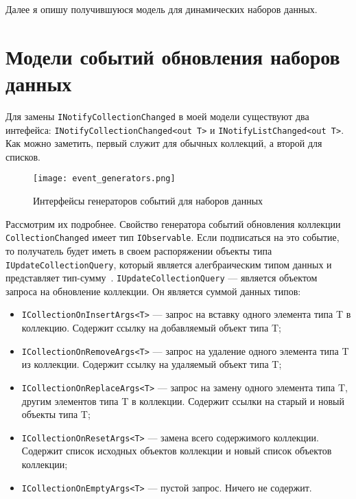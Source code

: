 Далее я опишу получившуюся модель для динамических наборов данных.

\section{Модели событий обновления наборов данных}
\label{sub:research:event_model}

Для замены \lstinline[style=csharpinlinestyle]!INotifyCollectionChanged! в моей модели существуют два интефейса:
\lstinline[style=csharpinlinestyle]!INotifyCollectionChanged<out T>! и \lstinline[style=csharpinlinestyle]!INotifyListChanged<out T>!.
Как можно заметить, первый служит для обычных коллекций, а второй для списков.

\begin{figure}[ht]
\centering
  \texttt{[image: event\_generators.png]}
  \caption{ Интерфейсы генераторов событий для наборов данных }
  \label{fig:event_generators}
\end{figure}

Рассмотрим их подробнее. Свойство генератора событий обновления коллекции \lstinline[style=csharpinlinestyle]!CollectionChanged! имеет тип \lstinline[style=csharpinlinestyle]!IObservable!.
Если подписаться на это событие, то получатель будет иметь в своем распоряжении объекты типа \lstinline[style=csharpinlinestyle]!IUpdateCollectionQuery!,
который является алегбраическим типом данных и представляет тип-сумму~\cite{algebraic_data_type}.
\lstinline[style=csharpinlinestyle]!IUpdateCollectionQuery! --- является объектом запроса на обновление коллекции.
Он является суммой данных типов:

\begin{itemize}
  \item \lstinline[style=csharpinlinestyle]!ICollectionOnInsertArgs<T>! --- запрос на вставку одного элемента типа T в коллекцию. Содержит ссылку на добавляемый объект типа T;
  \item \lstinline[style=csharpinlinestyle]!ICollectionOnRemoveArgs<T>! --- запрос на удаление одного элемента типа T из коллекции. Содержит ссылку на удаляемый объект типа T;
  \item \lstinline[style=csharpinlinestyle]!ICollectionOnReplaceArgs<T>! --- запрос на замену одного элемента типа T, другим элементов типа T в коллекции. Содержит ссылки на старый и новый объекты типа T;
  \item \lstinline[style=csharpinlinestyle]!ICollectionOnResetArgs<T>! --- замена всего содержимого коллекции. Содержит список исходных объектов коллекции и новый список объектов коллекции;
  \item \lstinline[style=csharpinlinestyle]!ICollectionOnEmptyArgs<T>! --- пустой запрос. Ничего не содержит.
\end{itemize}

